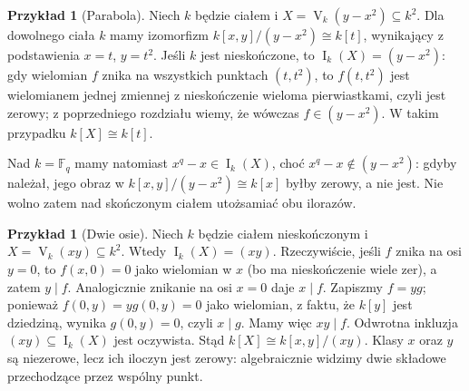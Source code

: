 \documentclass[11pt,a4paper,openany]{report}
\numberwithin{equation}{section}
\theoremstyle{plain}
\theoremstyle{definition}
\newtheorem{przyklad}[twierdzenie]{Przykład}
\theoremstyle{remark}
\newcommand{\F}{\mathbb F}
\newcommand{\V}{\operatorname V}
\newcommand{\I}{\operatorname I}
\begin{document}
\begin{przyklad}[Parabola]
Niech $k$ będzie ciałem i $X=\V_k(y-x^2)\subseteq k^2$.
Dla dowolnego ciała $k$ mamy izomorfizm
$k[x,y]/(y-x^2)\cong k[t]$, wynikający z podstawienia
$x=t$, $y=t^2$. Jeśli $k$ jest nieskończone, to
$\I_k(X)=(y-x^2)$: gdy wielomian $f$ znika na wszystkich
punktach $(t,t^2)$, to $f(t,t^2)$ jest wielomianem jednej
zmiennej z nieskończenie wieloma pierwiastkami, czyli jest zerowy;
z poprzedniego rozdziału wiemy, że wówczas $f\in(y-x^2)$.
W takim przypadku $k[X]\cong k[t]$.

Nad $k=\F_q$ mamy natomiast $x^q-x\in\I_k(X)$,
choć $x^q-x\notin(y-x^2)$: gdyby należał, jego obraz w
$k[x,y]/(y-x^2)\cong k[x]$ byłby zerowy, a nie jest.
Nie wolno zatem nad skończonym ciałem utożsamiać obu ilorazów.
\end{przyklad}

\begin{przyklad}[Dwie osie]
Niech $k$ będzie ciałem nieskończonym i
$X=\V_k(xy)\subseteq k^2$. Wtedy $\I_k(X)=(xy)$.
Rzeczywiście, jeśli $f$ znika na osi $y=0$, to
$f(x,0)=0$ jako wielomian w $x$ (bo ma nieskończenie wiele zer),
a zatem $y\mid f$. Analogicznie znikanie na osi $x=0$
daje $x\mid f$. Zapiszmy $f=yg$; ponieważ $f(0,y)=yg(0,y)=0$
jako wielomian, z faktu, że $k[y]$ jest dziedziną, wynika
$g(0,y)=0$, czyli $x\mid g$. Mamy więc $xy\mid f$.
Odwrotna inkluzja $(xy)\subseteq\I_k(X)$ jest oczywista.
Stąd $k[X]\cong k[x,y]/(xy)$. Klasy $x$ oraz $y$
są niezerowe, lecz ich iloczyn jest zerowy: algebraicznie
widzimy dwie składowe przechodzące przez wspólny punkt.
\end{przyklad}
\end{document}
